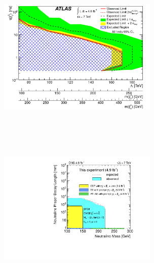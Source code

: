 \begin{center}
\centering
\mbox{\includegraphics[height=3.0in,width=3.0in]
{THESISPLOTS/ATLAS_Upper_Limit.png} \quad
\includegraphics[height=3.1in,width=3.0in]{THESISPLOTS/2D_exclusion.pdf}}
\label{fig:UpperLimits}
\end{center}





